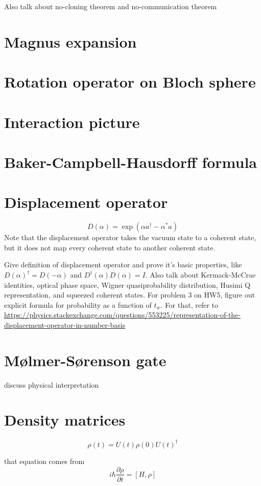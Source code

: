 \documentclass{article}
\begin{document}
Also talk about no-cloning theorem and no-communication theorem
\section{Magnus expansion}
\section{Rotation operator on Bloch sphere}
\section{Interaction picture}
\section{Baker-Campbell-Hausdorff formula}
\section{Displacement operator}
\[ D(\alpha) = \exp \left( \alpha a^\dag -\alpha^* a \right)  \]
Note that the displacement operator takes the vacuum state to a coherent state, but it does not map every coherent state to another coherent state.
\par
Give definition of displacement operator and prove it's basic properties, like $D(\alpha)^\dag = D(-\alpha)$ and $D^\dag(\alpha)D(\alpha)=I$. Also talk about Kermack-McCrae identities, optical phase space, Wigner quasiprobability distribution, Husimi Q representation, and squeezed coherent states. For problem 3 on HW5, figure out explicit formula for probability as a function of $t_w$. For that, refer to \url{https://physics.stackexchange.com/questions/553225/representation-of-the-displacement-operator-in-number-basis}
\section{Mølmer-Sørenson gate}
discuss physical interpretation
\section{Density matrices}
\[ \rho(t) = U(t) \rho(0) U(t)^\dag \]

that equation comes from
\[ i\hbar \frac{\partial \rho}{\partial t} = [H, \rho] \]
\end{document}
